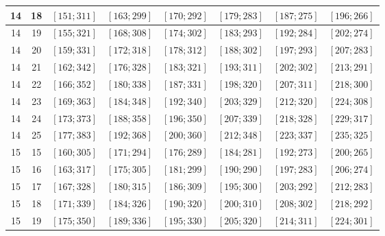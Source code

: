 \documentclass[a4paper,12pt]{article}
\begin{document}
\begin{center}
{\begin{longtable}[H]{|c|c|c|c|c|c|c|c|}
14 &  18 &  $\left[ 151; 311\right]$ &  $\left[ 163; 299\right]$ &  $\left[ 170; 292\right]$ &  $\left[ 179; 283\right]$ &  $\left[ 187; 275\right]$ &  $\left[ 196; 266\right]$ \tabularnewline \hline
14 &  19 &  $\left[ 155; 321\right]$ &  $\left[ 168; 308\right]$ &  $\left[ 174; 302\right]$ &  $\left[ 183; 293\right]$ &  $\left[ 192; 284\right]$ &  $\left[ 202; 274\right]$ \tabularnewline \hline
14 &  20 &  $\left[ 159; 331\right]$ &  $\left[ 172; 318\right]$ &  $\left[ 178; 312\right]$ &  $\left[ 188; 302\right]$ &  $\left[ 197; 293\right]$ &  $\left[ 207; 283\right]$ \tabularnewline \hline
14 &  21 &  $\left[ 162; 342\right]$ &  $\left[ 176; 328\right]$ &  $\left[ 183; 321\right]$ &  $\left[ 193; 311\right]$ &  $\left[ 202; 302\right]$ &  $\left[ 213; 291\right]$ \tabularnewline \hline
14 &  22 &  $\left[ 166; 352\right]$ &  $\left[ 180; 338\right]$ &  $\left[ 187; 331\right]$ &  $\left[ 198; 320\right]$ &  $\left[ 207; 311\right]$ &  $\left[ 218; 300\right]$ \tabularnewline \hline
14 &  23 &  $\left[ 169; 363\right]$ &  $\left[ 184; 348\right]$ &  $\left[ 192; 340\right]$ &  $\left[ 203; 329\right]$ &  $\left[ 212; 320\right]$ &  $\left[ 224; 308\right]$ \tabularnewline \hline
14 &  24 &  $\left[ 173; 373\right]$ &  $\left[ 188; 358\right]$ &  $\left[ 196; 350\right]$ &  $\left[ 207; 339\right]$ &  $\left[ 218; 328\right]$ &  $\left[ 229; 317\right]$ \tabularnewline \hline
14 &  25 &  $\left[ 177; 383\right]$ &  $\left[ 192; 368\right]$ &  $\left[ 200; 360\right]$ &  $\left[ 212; 348\right]$ &  $\left[ 223; 337\right]$ &  $\left[ 235; 325\right]$ \tabularnewline \hline
15 &  15 &  $\left[ 160; 305\right]$ &  $\left[ 171; 294\right]$ &  $\left[ 176; 289\right]$ &  $\left[ 184; 281\right]$ &  $\left[ 192; 273\right]$ &  $\left[ 200; 265\right]$ \tabularnewline \hline
15 &  16 &  $\left[ 163; 317\right]$ &  $\left[ 175; 305\right]$ &  $\left[ 181; 299\right]$ &  $\left[ 190; 290\right]$ &  $\left[ 197; 283\right]$ &  $\left[ 206; 274\right]$ \tabularnewline \hline
15 &  17 &  $\left[ 167; 328\right]$ &  $\left[ 180; 315\right]$ &  $\left[ 186; 309\right]$ &  $\left[ 195; 300\right]$ &  $\left[ 203; 292\right]$ &  $\left[ 212; 283\right]$ \tabularnewline \hline
15 &  18 &  $\left[ 171; 339\right]$ &  $\left[ 184; 326\right]$ &  $\left[ 190; 320\right]$ &  $\left[ 200; 310\right]$ &  $\left[ 208; 302\right]$ &  $\left[ 218; 292\right]$ \tabularnewline \hline
15 &  19 &  $\left[ 175; 350\right]$ &  $\left[ 189; 336\right]$ &  $\left[ 195; 330\right]$ &  $\left[ 205; 320\right]$ &  $\left[ 214; 311\right]$ &  $\left[ 224; 301\right]$ \tabularnewline \hline

\end{longtable}}
\end{center}
\end{document}
